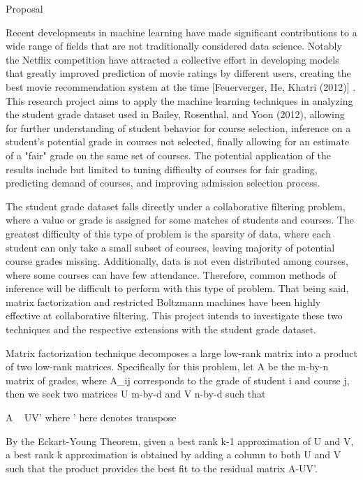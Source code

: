 Proposal

Recent developments in machine learning have made significant 
contributions to a wide range of fields that are not 
traditionally considered data science.
Notably the Netflix competition have attracted a collective
effort in developing models that greatly improved prediction
of movie ratings by different users,
creating the best movie recommendation system at the time
 [Feuerverger, He, Khatri (2012)] .
This research project aims to apply the machine learning
techniques in analyzing the student grade dataset used in 
Bailey, Rosenthal, and Yoon (2012),
allowing for further understanding of student behavior for
course selection, inference on a student's potential grade
in courses not selected, finally allowing for an estimate
of a "fair" grade on the same set of courses.
The potential application of the results include but limited to
tuning difficulty of courses for fair grading, 
predicting demand of courses,
and improving admission selection process.

The student grade dataset falls directly under a collaborative
filtering problem, where a value or grade is assigned for
some matches of students and courses.
The greatest difficulty of this type of problem is the sparsity
of data, where each student can only take a small subset of 
courses, leaving majority of potential course grades missing.
Additionally, data is not even distributed among courses, 
where some courses can have few attendance.
Therefore, common methods of inference will be difficult
to perform with this type of problem.
That being said, matrix factorization and restricted Boltzmann
machines have been highly effective at collaborative filtering.
This project intends to investigate these two techniques and
the respective extensions with the student grade dataset.

Matrix factorization technique decomposes a large low-rank
matrix into a product of two low-rank matrices.
Specifically for this problem, let A be the m-by-n matrix of grades,
where A_ij corresponds to the grade of student i and course j,
then we seek two matrices U m-by-d and V n-by-d such that

A ~ UV'    where ' here denotes transpose

By the Eckart-Young Theorem, given a best rank k-1 approximation
of U and V, a best rank k approximation is obtained by adding
a column to both U and V such that the product provides the
best fit to the residual matrix A-UV'.




















